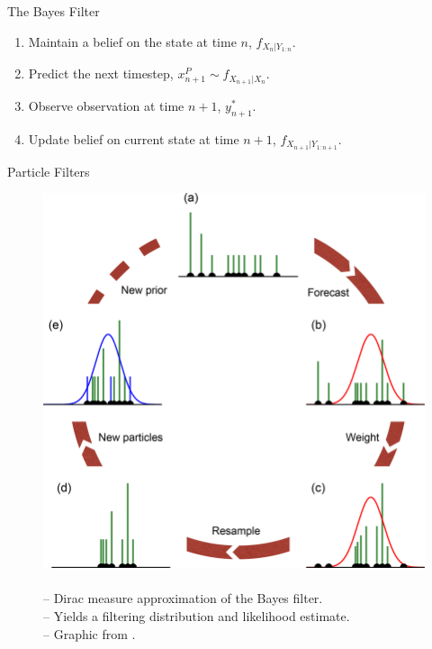 \documentclass{beamer}
\begin{document}
\begin{frame}{The Bayes Filter}
    \begin{enumerate}
        \item Maintain a belief on the state at time $n$, $f_{X_{n}|Y_{1:n}}$. 
        \item \pause Predict the next timestep, $x_{n+1}^P \sim f_{X_{n+1}|X_{n}}$.
        \item \pause Observe observation at time $n+1$, $y_{n+1}^*$.
        \item \pause Update belief on current state at time $n+1$, $f_{X_{n+1}|Y_{1:n+1}}$.
    \end{enumerate}
\end{frame}


\begin{frame}{Particle Filters}

    \begin{figure}
        \centering
        \begin{minipage}[c]{0.5\textwidth}
            \centering
            \includegraphics[scale=0.125]{imgs/pfilter.png}
            \end{minipage}
        \begin{minipage}[c]{0.45\textwidth}
            \caption{
            \\
            -- Dirac measure approximation of the Bayes filter. 
            \\ 
            -- Yields a filtering distribution and likelihood estimate.
            \\ 
            -- Graphic from \cite{berg2019pfilterimage}.}
        \end{minipage}
        \label{fig:pfilter-illustration}
    \end{figure}
    

\end{frame}
\end{document}
